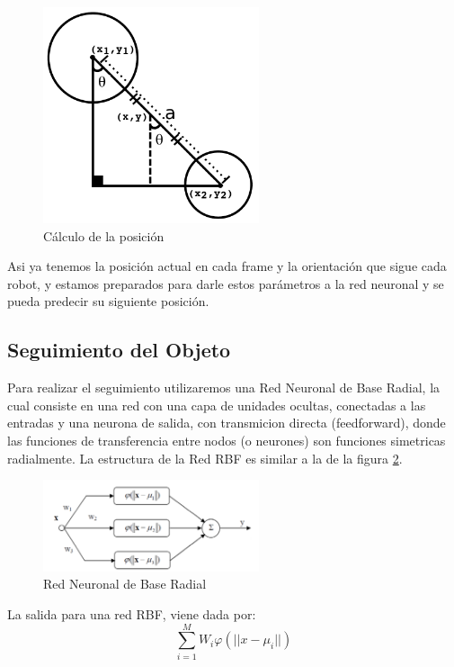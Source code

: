 \documentclass[conference]{IEEEtran}
\begin{document}
\begin{figure}
\centering
\includegraphics[width=2.5in]{imagen2.pdf}
\caption{C\'alculo de la posici\'on}
\label{fig_imgpos}
\end{figure}
Asi ya tenemos la posici\'on actual en cada frame y la orientaci\'on que sigue cada robot, y estamos preparados para darle estos par\'ametros a la red neuronal  y se pueda predecir su siguiente posici\'on.


\subsection{Seguimiento del Objeto}
Para realizar el seguimiento utilizaremos una Red Neuronal de Base Radial, la cual consiste en una red con una  capa de unidades ocultas, conectadas a las entradas y una neurona de salida, con transmicion directa (feedforward), donde las funciones de transferencia entre nodos (o neurones) son funciones simetricas radialmente. La estructura de la Red RBF es similar a la de la  figura \ref{fig_RBF}.
\begin{figure}
\centering
\includegraphics[width=2.5in]{RBF.pdf}
\caption{Red Neuronal de Base Radial }
\label{fig_RBF}
\end{figure}

La salida para una red RBF, viene dada por: 
\[
\sum_{i=1}^{M}W_{i}\varphi(||x-\mu_i||)
\]
\end{document}
